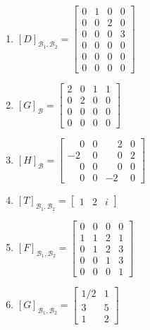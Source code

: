 \documentclass[12pt]{exam}
\begin{document}
\begin{exercicio}
\begin{solucao}
\begin{enumerate}[label={\alph*})]
            \item $[D]_{\mathcal{B}_1, \mathcal{B}_2} = \begin{bmatrix}
                0 & 1 & 0 & 0\\
                0 & 0 & 2 & 0\\
                0 & 0 & 0 & 3\\
                0 & 0 & 0 & 0\\
                0 & 0 & 0 & 0\\
                0 & 0 & 0 & 0
            \end{bmatrix}$

            \item $[G]_\mathcal{B} = \begin{bmatrix}
                2 & 0 & 1 & 1\\
                0 & 2 & 0 & 0\\
                0 & 0 & 0 & 0\\
                0 & 0 & 0 & 0
            \end{bmatrix}$

            \item $[H]_\mathcal{B} = \begin{bmatrix}
                \phantom{-}0 & 0 & \phantom{-}2 & 0\\
                -2 & 0 & \phantom{-}0 & 2\\
                \phantom{-}0 & 0 & \phantom{-}0 & 0\\
                \phantom{-}0 & 0 & -2 & 0
            \end{bmatrix}$

            \item $[T]_{\mathcal{B}_1, \mathcal{B}_2} = \begin{bmatrix}
                1 & 2 & i
            \end{bmatrix}$

            \item $[F]_{\mathcal{B}_1, \mathcal{B}_2} = \begin{bmatrix}
                0 & 0 & 0 & 0\\
                1 & 1 & 2 & 1\\
                0 & 1 & 2 & 3\\
                0 & 0 & 1 & 3\\
                0 & 0 & 0 & 1
            \end{bmatrix}$

            \item $[G]_{\mathcal{B}_1, \mathcal{B}_2} = \begin{bmatrix}
                1/2 & 1\\
                3 & 5\\
                1 & 2
            \end{bmatrix}$


\end{enumerate}
\end{solucao}
\end{exercicio}
\end{document}
